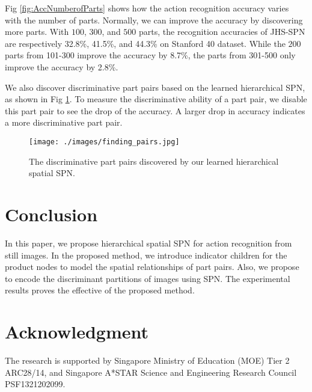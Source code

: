 \documentclass[journal]{IEEEtran}
\begin{document}
Fig \ref{fig:AccNumberofParts} shows how the action recognition accuracy varies with the number of parts. Normally, we can improve the accuracy by discovering more parts. With $ 100 $, $ 300 $, and $ 500 $ parts, the recognition accuracies of JHS-SPN are respectively 32.8\%, 41.5\%, and 44.3\% on Stanford 40 dataset. While the $ 200 $ parts from 101-300 improve the accuracy by 8.7\%, the parts from 301-500 only improve the accuracy by 2.8\%.


We also discover discriminative part pairs based on the learned hierarchical SPN, as shown in Fig \ref{fig:finding_pairs}. To measure the discriminative ability of a part pair, we disable this part pair to see the drop of the accuracy. A larger drop in accuracy indicates a more discriminative part pair. 



\begin{figure}[htb]
	\begin{center}
		\texttt{[image: ./images/finding\_pairs.jpg]}
	\end{center}
	\caption{The discriminative part pairs discovered by our learned hierarchical spatial SPN.}
	\label{fig:finding_pairs}
\end{figure}



\section{Conclusion}
\label{Sec:Conclusion}

In this paper, we propose hierarchical spatial SPN for action recognition from still images. In the proposed method, we introduce indicator children for the product nodes to model the spatial relationships of part pairs. Also, we propose to encode the discriminant partitions of images using SPN. The experimental results proves the effective of the proposed method.












\section*{Acknowledgment}
The research is supported by Singapore Ministry of Education (MOE) Tier 2 ARC28/14, and Singapore A*STAR Science and Engineering Research Council PSF1321202099.
\end{document}
